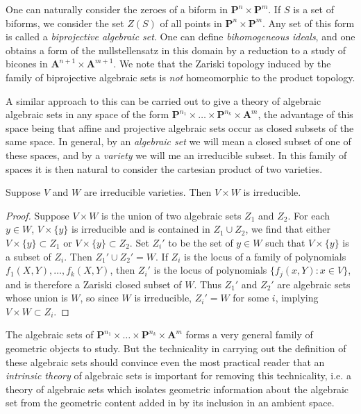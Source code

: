 One can naturally consider the zeroes of a biform in $\mathbf{P}^n \times \mathbf{P}^m$. If $S$ is a set of biforms, we consider the set $Z(S)$ of all points in $\mathbf{P}^n \times \mathbf{P}^m$. Any set of this form is called a \emph{biprojective algebraic set}. One can define \emph{bihomogeneous ideals}, and one obtains a form of the nullstellensatz in this domain by a reduction to a study of bicones in $\mathbf{A}^{n+1} \times \mathbf{A}^{m+1}$. We note that the Zariski topology induced by the family of biprojective algebraic sets is \emph{not} homeomorphic to the product topology. 

A similar approach to this can be carried out to give a theory of algebraic algebraic sets in any space of the form $\mathbf{P}^{n_1} \times \dots \times \mathbf{P}^{n_k} \times \mathbf{A}^m$, the advantage of this space being that affine and projective algebraic sets occur as closed subsets of the same space. In general, by an \emph{algebraic set} we will mean a closed subset of one of these spaces, and by a \emph{variety} we will me an irreducible subset. In this family of spaces it is then natural to consider the cartesian product of two varieties.

\begin{theorem}
    Suppose $V$ and $W$ are irreducible varieties. Then $V \times W$ is irreducible.
\end{theorem}
\begin{proof}
    Suppose $V \times W$ is the union of two algebraic sets $Z_1$ and $Z_2$. For each $y \in W$, $V \times \{ y \}$ is irreducible and is contained in $Z_1 \cup Z_2$, we find that either $V \times \{ y \} \subset Z_1$ or $V \times \{ y \} \subset Z_2$. Set $Z_i'$ to be the set of $y \in W$ such that $V \times \{ y \}$ is a subset of $Z_i$. Then $Z_1' \cup Z_2' = W$. If $Z_i$ is the locus of a family of polynomials $f_1(X,Y),\dots,f_k(X,Y)$, then $Z_i'$ is the locus of polynomials $\{ f_j(x,Y) : x \in V \}$, and is therefore a Zariski closed subset of $W$. Thus $Z_1'$ and $Z_2'$ are algebraic sets whose union is $W$, so since $W$ is irreducible, $Z_i' = W$ for some $i$, implying $V \times W \subset Z_i$.
\end{proof}

The algebraic sets of $\mathbf{P}^{n_1} \times \dots \times \mathbf{P}^{n_k} \times \mathbf{A}^m$ forms a very general family of geometric objects to study. But the technicality in carrying out the definition of these algebraic sets should convince even the most practical reader that an \emph{intrinsic theory} of algebraic sets is important for removing this technicality, i.e. a theory of algebraic sets which isolates geometric information about the algebraic set from the geometric content added in by its inclusion in an ambient space.














